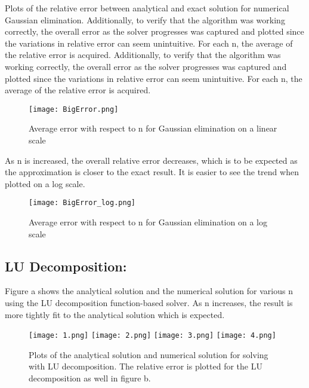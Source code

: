 \documentclass[12pt]{article}
\begin{document}
Plots of the relative error between analytical and exact solution for numerical Gaussian elimination. Additionally, to verify that the algorithm was working correctly, the overall error as the solver progresses was captured and plotted since the variations in relative error can seem unintuitive. For each n, the average of the relative error is acquired. Additionally, to verify that the algorithm was working correctly, the overall error as the solver progresses was captured and plotted since the variations in relative error can seem unintuitive. For each n, the average of the relative error is acquired.\\

\begin{figure}[H]
	\centering
	\graphicspath{ {c:/Users/charl/Documents/Precision/Gauss/}{C:/Users/Mike/Documents/GitHub/sayboltm/PHY480/Project1/Report/Precision/Gauss/}}
	\texttt{[image: BigError.png]}
	\caption{Average error with respect to n for Gaussian elimination on a linear scale}
\end{figure}
 \pagebreak
As n is increased, the overall relative error decreases, which is to be expected as the approximation is closer to the exact result. It is easier to see the trend when plotted on a log scale.\\

\begin{figure}[H]
\centering
\graphicspath{ {c:/Users/charl/Documents/Precision/Gauss/}{C:/Users/Mike/Documents/GitHub/sayboltm/PHY480/Project1/Report/Precision/Gauss/}}
\texttt{[image: BigError\_log.png]}
\caption{Average error with respect to n for Gaussian elimination on a log scale}
\end{figure}

\subsection{LU Decomposition:}
Figure a shows the analytical solution and the numerical solution for various n using the LU decomposition function-based solver. As n increases, the result is more tightly fit to the analytical solution which is expected.\\

\begin{figure}[H]
\centering
\graphicspath{ {c:/Users/charl/Documents/Precision/LU/}{C:/Users/Mike/Documents/GitHub/sayboltm/PHY480/Project1/Report/Precision/Gauss/}}
\texttt{[image: 1.png]}
\texttt{[image: 2.png]}
\texttt{[image: 3.png]}
\texttt{[image: 4.png]}\\
\centering
\caption{Plots of the analytical solution and numerical solution for solving with LU decomposition. The relative error is plotted for the LU decomposition as well in figure b.}
\end{figure}
\end{document}
